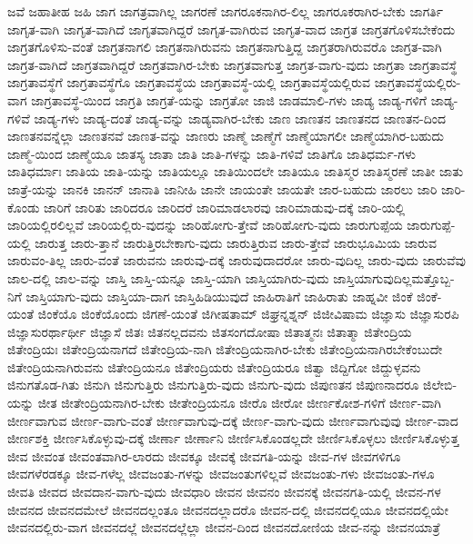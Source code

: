 {ಜವೆ
ಜಹಾತೀಹ
ಜಹಿ
ಜಾಗ
ಜಾಗತ್ರವಾಗಿಲ್ಲ
ಜಾಗರಣೆ
ಜಾಗರೂಕನಾಗಿರ-ಲಿಲ್ಲ
ಜಾಗರೂಕರಾಗಿರ-ಬೇಕು
ಜಾಗರ್ತಿ
ಜಾಗೃತ-ವಾಗಿ
ಜಾಗೃತ-ವಾಗಿದೆ
ಜಾಗೃತವಾಗಿದ್ದರೆ
ಜಾಗೃತ-ವಾಗಿರುವ
ಜಾಗೃತ-ವಾದ
ಜಾಗ್ರತ
ಜಾಗ್ರತಗೊಳಿಸಬೇಕೆಂದು
ಜಾಗ್ರತಗೊಳಿಸು-ವಂತೆ
ಜಾಗ್ರತನಾಗಲಿ
ಜಾಗ್ರತನಾಗಿರುವನು
ಜಾಗ್ರತನಾಗುತ್ತಿದ್ದ
ಜಾಗ್ರತರಾಗಿರುವರೊ
ಜಾಗ್ರತ-ವಾಗಿ
ಜಾಗ್ರತ-ವಾಗಿದೆ
ಜಾಗ್ರತವಾಗಿದ್ದರೆ
ಜಾಗ್ರತವಾಗಿರ-ಬೇಕು
ಜಾಗ್ರತವಾಗುತ್ತ
ಜಾಗ್ರತ-ವಾಗು-ವುದು
ಜಾಗ್ರತಾ
ಜಾಗ್ರತಾವಸ್ಥೆ
ಜಾಗ್ರತಾವಸ್ಥೆಗೆ
ಜಾಗ್ರತಾವಸ್ಥೆಗೊ
ಜಾಗ್ರತಾವಸ್ಥೆಯ
ಜಾಗ್ರತಾವಸ್ಥೆ-ಯಲ್ಲಿ
ಜಾಗ್ರತಾವಸ್ಥೆಯಲ್ಲಿರುವ
ಜಾಗ್ರತಾವಸ್ಥೆಯಲ್ಲಿರು-ವಾಗ
ಜಾಗ್ರತಾವಸ್ಥೆ-ಯಿಂದ
ಜಾಗ್ರತಿ
ಜಾಗ್ರತೆ-ಯನ್ನು
ಜಾಗ್ರತೋ
ಜಾಜಿ
ಜಾಡಮಾಲಿ-ಗಳು
ಜಾಡ್ಯ
ಜಾಡ್ಯ-ಗಳಿಗೆ
ಜಾಡ್ಯ-ಗಳಿವೆ
ಜಾಡ್ಯ-ಗಳು
ಜಾಡ್ಯ-ದಂತೆ
ಜಾಡ್ಯ-ವನ್ನು
ಜಾಡ್ಯವಾಗಿರ-ಬೇಕು
ಜಾಣ
ಜಾಣತನ
ಜಾಣತನದ
ಜಾಣತನ-ದಿಂದ
ಜಾಣತನವನ್ನೆಲ್ಲಾ
ಜಾಣತನವೆ
ಜಾಣತ-ವನ್ನು
ಜಾಣರು
ಜಾಣ್ಮೆ
ಜಾಣ್ಮೆಗೆ
ಜಾಣ್ಮೆಯಾಗಲೀ
ಜಾಣ್ಮೆಯಾಗಿರ-ಬಹುದು
ಜಾಣ್ಮೆ-ಯಿಂದ
ಜಾಣ್ಮೆಯೂ
ಜಾತಸ್ಯ
ಜಾತಾ
ಜಾತಿ
ಜಾತಿ-ಗಳನ್ನು
ಜಾತಿ-ಗಳಿವೆ
ಜಾತಿಗೊ
ಜಾತಿಧರ್ಮ-ಗಳು
ಜಾತಿಧರ್ಮಾಃ
ಜಾತಿಯ
ಜಾತಿ-ಯನ್ನು
ಜಾತಿಯಲ್ಲೂ
ಜಾತಿಯಿಂದಲೇ
ಜಾತಿಯೂ
ಜಾತಿಸ್ಮರ
ಜಾತಿಸ್ಮರಣೆ
ಜಾತೀ
ಜಾತು
ಜಾತ್ರೆ-ಯನ್ನು
ಜಾನಕಿ
ಜಾನನ್
ಜಾನಾತಿ
ಜಾನೀಹಿ
ಜಾನೇ
ಜಾಯಂತೇ
ಜಾಯತೇ
ಜಾರ-ಬಹುದು
ಜಾರಲು
ಜಾರಿ
ಜಾರಿ-ಕೊಂಡು
ಜಾರಿಗೆ
ಜಾರಿತು
ಜಾರಿದರೂ
ಜಾರಿದರೆ
ಜಾರಿಮಾಡಲಾರವು
ಜಾರಿಮಾಡುವು-ದಕ್ಕೆ
ಜಾರಿ-ಯಲ್ಲಿ
ಜಾರಿಯಲ್ಲಿರಲಿಲ್ಲವೆ
ಜಾರಿಯಲ್ಲಿರು-ವುದನ್ನು
ಜಾರಿಹೋಗು-ತ್ತೇವೆ
ಜಾರಿಹೋಗು-ವುದು
ಜಾರುಗುಪ್ಪೆಯ
ಜಾರುಗುಪ್ಪೆ-ಯಲ್ಲಿ
ಜಾರುತ್ತ
ಜಾರು-ತ್ತಾನೆ
ಜಾರುತ್ತಿರಬೇಕಾಗು-ವುದು
ಜಾರುತ್ತಿರುವ
ಜಾರು-ತ್ತೇವೆ
ಜಾರುಭೂಮಿಯ
ಜಾರುವ
ಜಾರುವಂ-ತಿಲ್ಲ
ಜಾರು-ವಂತೆ
ಜಾರುವನು
ಜಾರುವು-ದಕ್ಕೆ
ಜಾರುವುದಾದರೋ
ಜಾರು-ವುದಿಲ್ಲ
ಜಾರು-ವುದು
ಜಾರುವೆವು
ಜಾಲ-ದಲ್ಲಿ
ಜಾಲ-ವನ್ನು
ಜಾಸ್ತಿ
ಜಾಸ್ತಿ-ಯನ್ನೂ
ಜಾಸ್ತಿ-ಯಾಗಿ
ಜಾಸ್ತಿಯಾಗಿರು-ವುದು
ಜಾಸ್ತಿಯಾಗುವುದಿಲ್ಲಮತ್ತೊಬ್ಬ-ನಿಗೆ
ಜಾಸ್ತಿಯಾಗು-ವುದು
ಜಾಸ್ತಿಯಾ-ದಾಗ
ಜಾಸ್ತಿಹಿಡಿಯುವುದೆ
ಜಾಹಿರಾತಿಗೆ
ಜಾಹಿರಾತು
ಜಾಹ್ನವೀ
ಜಿಂಕೆ
ಜಿಂಕೆ-ಯಂತೆ
ಜಿಂಕೆಯೊ
ಜಿಂಕೆಯೊಂದು
ಜಿಗಣೆ-ಯಂತೆ
ಜಿಗೀಷತಾಮ್
ಜಿಘ್ರನ್ನಶ್ನನ್
ಜಿಜೀವಿಷಾಮ
ಜಿಜ್ಞಾಸು
ಜಿಜ್ಞಾಸುರಪಿ
ಜಿಜ್ಞಾಸುರರ್ಥಾರ್ಥೀ
ಜಿಜ್ಞಾಸೆ
ಜಿತಃ
ಜಿತನಲ್ಲದವನು
ಜಿತಸಂಗದೋಷಾ
ಜಿತಾತ್ಮನಃ
ಜಿತಾತ್ಮಾ
ಜಿತೇಂದ್ರಿಯ
ಜಿತೇಂದ್ರಿಯಃ
ಜಿತೇಂದ್ರಿಯನಾಗದೆ
ಜಿತೇಂದ್ರಿಯ-ನಾಗಿ
ಜಿತೇಂದ್ರಿಯನಾಗಿರ-ಬೇಕು
ಜಿತೇಂದ್ರಿಯನಾಗಿರಬೇಕೆಂಬುದೇ
ಜಿತೇಂದ್ರಿಯನಾಗಿರುವನು
ಜಿತೇಂದ್ರಿಯನೂ
ಜಿತೇಂದ್ರಿಯರು
ಜಿತೇಂದ್ರಿಯರೂ
ಜಿತ್ವಾ
ಜಿದ್ದಿಗೋ
ಜಿದ್ದುಳ್ಳವನು
ಜಿನುಗತೊಡ-ಗಿತು
ಜಿನುಗಿ
ಜಿನುಗುತ್ತಿರು
ಜಿನುಗುತ್ತಿರು-ವುದು
ಜಿನುಗು-ವುದು
ಜಿಪುಣತನ
ಜಿಪುಣನಾದರೂ
ಜಿಲೇಬಿ-ಯನ್ನು
ಜೀತ
ಜೀತೇಂದ್ರಿಯನಾಗಿರ-ಬೇಕು
ಜೀತೇಂದ್ರಿಯನೂ
ಜೀರೊ
ಜೀರೋ
ಜೀರ್ಣಕೋಶ-ಗಳಿಗೆ
ಜೀರ್ಣ-ವಾಗಿ
ಜೀರ್ಣವಾಗುವ
ಜೀರ್ಣ-ವಾಗು-ವಂತೆ
ಜೀರ್ಣವಾಗುವು-ದಕ್ಕೆ
ಜೀರ್ಣ-ವಾಗು-ವುದು
ಜೀರ್ಣವಾಗುವುವು
ಜೀರ್ಣ-ವಾದ
ಜೀರ್ಣಶಕ್ತಿ
ಜೀರ್ಣಸಿಕೊಳ್ಳುವು-ದಕ್ಕೆ
ಜೀರ್ಣಾ
ಜೀರ್ಣಾನಿ
ಜೀರ್ಣಿಸಿಕೊಂಡಲ್ಲದೇ
ಜೀರ್ಣಿಸಿಕೊಳ್ಳಲು
ಜೀರ್ಣಿಸಿಕೊಳ್ಳುತ್ತ
ಜೀವ
ಜೀವಂತ
ಜೀವಂತವಾಗಿರ-ಲಾರದು
ಜೀವಕ್ಕೂ
ಜೀವಕ್ಕೆ
ಜೀವಗತಿ-ಯನ್ನು
ಜೀವ-ಗಳ
ಜೀವಗಳಿಗೂ
ಜೀವಗಳೆರಡಕ್ಕೂ
ಜೀವ-ಗಳೆಲ್ಲ
ಜೀವಜಂತು-ಗಳನ್ನು
ಜೀವಜಂತುಗಳಿಲ್ಲವೆ
ಜೀವಜಂತು-ಗಳು
ಜೀವಜಂತು-ಗಳೂ
ಜೀವತಿ
ಜೀವದ
ಜೀವದಾನ-ವಾಗು-ವುದು
ಜೀವಧಾರಿ
ಜೀವನ
ಜೀವನಂ
ಜೀವನಕ್ಕೆ
ಜೀವನಗತಿ-ಯಲ್ಲಿ
ಜೀವನ-ಗಳ
ಜೀವನದ
ಜೀವನದಮೇಲೆ
ಜೀವನದಲ್ಲಂತೂ
ಜೀವನದಲ್ಲಾದರೊ
ಜೀವನ-ದಲ್ಲಿ
ಜೀವನದಲ್ಲಿಯೂ
ಜೀವನದಲ್ಲಿಯೇ
ಜೀವನದಲ್ಲಿರು-ವಾಗ
ಜೀವನದಲ್ಲೆ
ಜೀವನದಲ್ಲೆಲ್ಲಾ
ಜೀವನ-ದಿಂದ
ಜೀವನದೋಣಿಯ
ಜೀವ-ನನ್ನು
ಜೀವನಯಾತ್ರೆ
}
